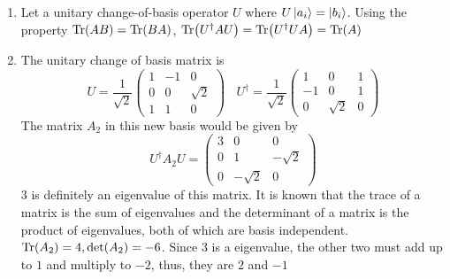 \begin{sol}
\begin{enumerate}[label=\textbf{(\alph*)}]
    \item
    Let a unitary change-of-basis operator $U$ where $U\ket {a_i}=\ket{b_i}$. Using the property $\Tr(AB)=\Tr(BA)$, $\Tr(U^\dagger AU)=\Tr(U^\dagger UA)=\Tr(A)$
    \item
    The unitary change of basis matrix is
    \begin{equation}
	U=\frac{1}{\sqrt{2}}\begin{pmatrix}1&-1&0\\0&0&\sqrt{2}\\1&1&0\end{pmatrix}\:\:\:\:U^\dagger=\frac{1}{\sqrt{2}}\begin{pmatrix}1&0&1\\-1&0&1\\0&\sqrt{2}&0\end{pmatrix}
\end{equation}
    The matrix $A_2$ in this new basis would be given by 
    \begin{equation}
	U^\dagger A_2U=\begin{pmatrix}3&0&0\\0&1&-\sqrt{2}\\0&-\sqrt{2}&0\end{pmatrix}
\end{equation}
    $3$ is definitely an eigenvalue of this matrix. It is known that the trace of a matrix is the sum of eigenvalues and the determinant of a matrix is the product of eigenvalues, both of which are basis independent. $\Tr(A_2)=4, \det(A_2)=-6$. Since $3$ is a eigenvalue, the other two must add up to $1$ and multiply to $-2$, thus, they are $2$ and $-1$
\end{enumerate}
\end{sol}